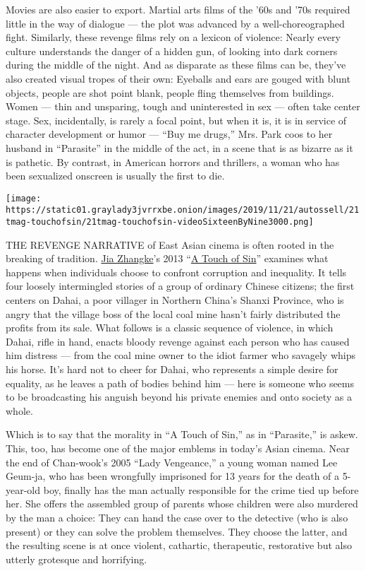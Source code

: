 Movies are also easier to export. Martial arts films of the '60s and
'70s required little in the way of dialogue --- the plot was advanced by
a well-choreographed fight. Similarly, these revenge films rely on a
lexicon of violence: Nearly every culture understands the danger of a
hidden gun, of looking into dark corners during the middle of the night.
And as disparate as these films can be, they've also created visual
tropes of their own: Eyeballs and ears are gouged with blunt objects,
people are shot point blank, people fling themselves from buildings.
Women --- thin and unsparing, tough and uninterested in sex --- often
take center stage. Sex, incidentally, is rarely a focal point, but when
it is, it is in service of character development or humor --- ``Buy me
drugs,'' Mrs. Park coos to her husband in ``Parasite'' in the middle of
the act, in a scene that is as bizarre as it is pathetic. By contrast,
in American horrors and thrillers, a woman who has been sexualized
onscreen is usually the first to die.

\texttt{[image: https://static01.graylady3jvrrxbe.onion/images/2019/11/21/autossell/21tmag-touchofsin/21tmag-touchofsin-videoSixteenByNine3000.png]}

THE REVENGE NARRATIVE of East Asian cinema is often rooted in the
breaking of tradition.
\href{https://sinosphere.blogs.nytimes3xbfgragh.onion/2013/10/18/q-a-jia-zhangke-on-his-new-film-a-touch-of-sin/}{Jia
Zhangke}'s 2013
``\href{https://www.nytimes3xbfgragh.onion/watching/titles/a-touch-of-sin}{A
Touch of Sin}'' examines what happens when individuals choose to
confront corruption and inequality. It tells four loosely intermingled
stories of a group of ordinary Chinese citizens; the first centers on
Dahai, a poor villager in Northern China's Shanxi Province, who is angry
that the village boss of the local coal mine hasn't fairly distributed
the profits from its sale. What follows is a classic sequence of
violence, in which Dahai, rifle in hand, enacts bloody revenge against
each person who has caused him distress --- from the coal mine owner to
the idiot farmer who savagely whips his horse. It's hard not to cheer
for Dahai, who represents a simple desire for equality, as he leaves a
path of bodies behind him --- here is someone who seems to be
broadcasting his anguish beyond his private enemies and onto society as
a whole.

Which is to say that the morality in ``A Touch of Sin,'' as in
``Parasite,'' is askew. This, too, has become one of the major emblems
in today's Asian cinema. Near the end of Chan-wook's 2005 ``Lady
Vengeance,'' a young woman named Lee Geum-ja, who has been wrongfully
imprisoned for 13 years for the death of a 5-year-old boy, finally has
the man actually responsible for the crime tied up before her. She
offers the assembled group of parents whose children were also murdered
by the man a choice: They can hand the case over to the detective (who
is also present) or they can solve the problem themselves. They choose
the latter, and the resulting scene is at once violent, cathartic,
therapeutic, restorative but also utterly grotesque and horrifying.

